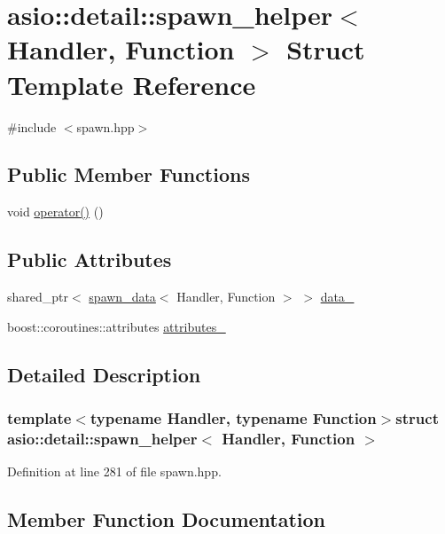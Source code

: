 \hypertarget{structasio_1_1detail_1_1spawn__helper}{}\section{asio\+:\+:detail\+:\+:spawn\+\_\+helper$<$ Handler, Function $>$ Struct Template Reference}
\label{structasio_1_1detail_1_1spawn__helper}


{\ttfamily \#include $<$spawn.\+hpp$>$}

\subsection*{Public Member Functions}
\begin{DoxyCompactItemize}
\item 
void \hyperlink{structasio_1_1detail_1_1spawn__helper_abd7a1422d0791a717b944f06980addaf}{operator()} ()
\end{DoxyCompactItemize}
\subsection*{Public Attributes}
\begin{DoxyCompactItemize}
\item 
shared\+\_\+ptr$<$ \hyperlink{structasio_1_1detail_1_1spawn__data}{spawn\+\_\+data}$<$ Handler, Function $>$ $>$ \hyperlink{structasio_1_1detail_1_1spawn__helper_a9905b71df2ab1fad3d13f9396d72506d}{data\+\_\+}
\item 
boost\+::coroutines\+::attributes \hyperlink{structasio_1_1detail_1_1spawn__helper_af369e4458578177e3961510b61e968fe}{attributes\+\_\+}
\end{DoxyCompactItemize}


\subsection{Detailed Description}
\subsubsection*{template$<$typename Handler, typename Function$>$struct asio\+::detail\+::spawn\+\_\+helper$<$ Handler, Function $>$}



Definition at line 281 of file spawn.\+hpp.



\subsection{Member Function Documentation}
\hypertarget{structasio_1_1detail_1_1spawn__helper_abd7a1422d0791a717b944f06980addaf}{}
